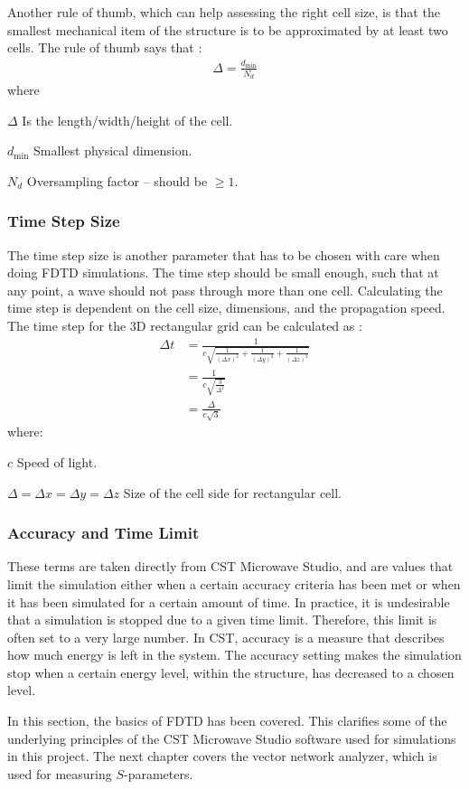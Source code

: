 Another rule of thumb, which can help assessing the right cell size, is that the smallest mechanical item of the structure is to be approximated by at least two cells. The rule of thumb says that \cite{kunz1993fdtd}:
\begin{align}
    \Delta = \frac{d_{\text{min}}}{N_d} 
\end{align}
where 
\begin{where}
\item[$\Delta$] Is the length/width/height of the cell.
\item[$d_{\text{min}}$] Smallest physical dimension.
\item[$N_d$] Oversampling factor -- should be $\geq 1$.
\end{where}

\subsubsection{Time Step Size}
The time step size is another parameter that has to be chosen with care when doing FDTD simulations. The time step should be small enough, such that at any point, a wave should not pass through more than one cell. Calculating the time step is dependent on the cell size, dimensions, and the propagation speed. The time step for the 3D rectangular grid can be calculated as \cite{kunz1993fdtd}:
\begin{align}
   \label{eq:deltat}
   \Delta t &= \frac{1}{c \sqrt{\frac{1}{(\Delta x)^2}+\frac{1}{(\Delta y)^2}+\frac{1}{(\Delta z)^2}}} \\
            &= \frac{1}{c \sqrt{\frac{3}{\Delta^2}}} \\
            &= \frac{\Delta}{c \sqrt{3}}            
\end{align}
where:
\begin{where}
\item [$c$] Speed of light.
\item [$\Delta = \Delta x = \Delta y = \Delta z$] Size of the cell side for rectangular cell.
\end{where}

\subsubsection{Accuracy and Time Limit}
These terms are taken directly from CST Microwave Studio, and are values that limit the simulation either when a certain accuracy criteria has been met or when it has been simulated for a certain amount of time. In practice, it is undesirable that a simulation is stopped due to a given time limit. Therefore, this limit is often set to a very large number. In CST, accuracy is a measure that describes how much energy is left in the system. The accuracy setting makes the simulation stop when a certain energy level, within the structure, has decreased to a chosen level. 

\begin{aautail}
    In this section, the basics of FDTD has been covered. This clarifies some of the underlying principles of the CST Microwave Studio software used for simulations in this project. The next chapter covers the vector network analyzer, which is used for measuring $S$-parameters.
\end{aautail}
